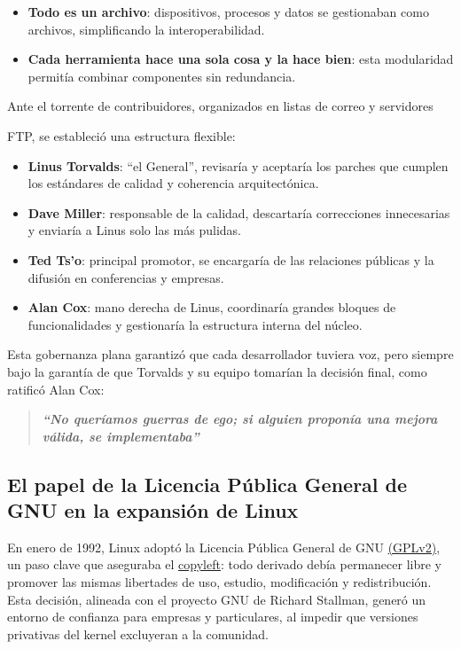\documentclass[a4paper,12pt]{article}
\begin{document}
\begin{itemize}[label=$\bullet$, itemsep=0.5em]
    \item \textbf{Todo es un archivo}: dispositivos, procesos y datos se
    gestionaban como archivos, simplificando la interoperabilidad.     
    \item \textbf{Cada herramienta hace una sola cosa y la hace bien}:
    esta modularidad permitía combinar componentes sin redundancia.
\end{itemize}

Ante el torrente de contribuidores, organizados en listas de correo y servidores

FTP, se estableció una estructura flexible:
\begin{itemize}[label=$\bullet$, itemsep=0.5em]
    \item \textbf{Linus Torvalds}: ``el General'', revisaría y aceptaría los parches que
    cumplen los estándares de calidad y coherencia arquitectónica. 
    \item \textbf{Dave Miller}: responsable de la calidad, descartaría correcciones
    innecesarias y enviaría a Linus solo las más pulidas.  
    \item \textbf{Ted Ts’o}: principal promotor, se encargaría de las relaciones
    públicas y la difusión en conferencias y empresas.  
    \item \textbf{Alan Cox}: mano derecha de Linus, coordinaría grandes bloques de
    funcionalidades y gestionaría la estructura interna del núcleo.
\end{itemize} 

Esta gobernanza plana garantizó que cada desarrollador tuviera voz, pero siempre
bajo la garantía de que Torvalds y su equipo tomarían la decisión final, como
ratificó Alan Cox: 
\begin{quote}
    \textbf{\textit{“No queríamos guerras de ego; si alguien proponía una mejora válida, se
    implementaba”}\cite{torvalds_just_2002}} 
\end{quote}
\newpage

\subsection{El papel de la Licencia Pública General de GNU en la expansión de Linux}

En enero de 1992, Linux adoptó la Licencia Pública General de GNU \hyperlink{gpl}{(GPLv2)}, un
paso clave que aseguraba el \hyperlink{copyleft}{copyleft}: todo derivado debía permanecer libre y
promover las mismas libertades de uso, estudio, modificación y redistribución. 
Esta decisión, alineada con el proyecto GNU de Richard Stallman, generó un
entorno de confianza para empresas y particulares, al impedir que versiones
privativas del kernel excluyeran a la comunidad.
\end{document}
